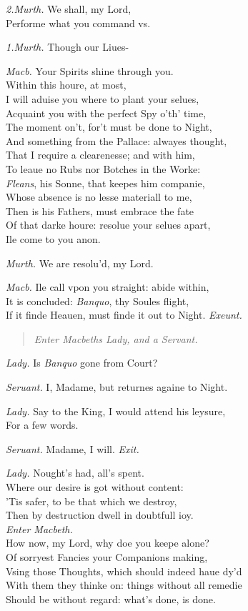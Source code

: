 \documentclass[12pt]{sides}
\newcommand{\StageDir}[1]{\begin{quote}\centering\em #1\end{quote}}
\newcommand{\clStageDir}[1]{\hspace*{\fill}\textit{#1}\hspace*{\fill}}
\newcommand{\elStageDir}[1]{\hfill\textit{#1}}
\newcommand{\dia}[1]{\hskip 15pt\textit{#1}\hskip 6pt}
\begin{document}
\begin{multicols}{2}
            \dia{2.Murth.} We shall, my Lord, \\ Performe what you command vs.

            \dia{1.Murth.} Though our Liues-

            \dia{Macb.} Your Spirits shine through you. \\ Within this houre, at most, \\ I will aduise you where to plant your selues, \\ Acquaint you with the perfect Spy o'th' time, \\ The moment on't, for't must be done to Night, \\ And something from the Pallace: alwayes thought, \\ That I require a clearenesse; and with him, \\ To leaue no Rubs nor Botches in the Worke: \\ \textit{Fleans}, his Sonne, that keepes him companie, \\ Whose absence is no lesse materiall to me, \\ Then is his Fathers, must embrace the fate \\ Of that darke houre: resolue your selues apart, \\ Ile come to you anon.

            \dia{Murth.} We are resolu'd, my Lord.

            \dia{Macb.} Ile call vpon you straight: abide within, \\ It is concluded: \textit{Banquo}, thy Soules flight, \\ If it finde Heauen, must finde it out to Night. \clStageDir{Exeunt.}
            \StageDir{Enter Macbeths Lady, and a Servant.}
            \dia{Lady.} Is \textit{Banquo} gone from Court?

            \dia{Seruant.} I, Madame, but returnes againe to Night.

            \dia{Lady.} Say to the King, I would attend his leysure, \\ For a few words.

            \dia{Seruant.} Madame, I will. \elStageDir{Exit.} \hspace{48pt}

            \dia{Lady.} Nought's had, all's spent. \\ Where our desire is got without content: \\ 'Tis safer, to be that which we destroy, \\ Then by destruction dwell in doubtfull ioy. \\ \clStageDir{Enter Macbeth.} \\ How now, my Lord, why doe you keepe alone? \\ Of sorryest Fancies your Companions making, \\ Vsing those Thoughts, which should indeed haue dy'd \\ With them they thinke on: things without all remedie \\ Should be without regard: what's done, is done.


\end{multicols}
\end{document}
